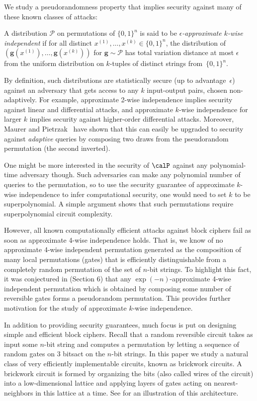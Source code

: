 We study a pseudorandomness property that implies security against many of these known classes of attacks:
\begin{definition}
    A distribution $\mathcal{P}$ on permutations of $\{0,1\}^n$ is said to be \emph{$\epsilon$-approximate $k$-wise independent} if for all distinct $x^{(1)}, \dots, x^{(k)} \in \{0,1\}^n$, the distribution of $(\boldsymbol{g}(x^{(1)}), \dots, \boldsymbol{g}(x^{(k)}))$ for $\boldsymbol{g} \sim \mathcal{P}$ has total variation distance at most $\epsilon$ from the uniform distribution on $k$-tuples of distinct strings from~$\{0,1\}^n$.
\end{definition}
By definition, such distributions are statistically secure (up to advantage~$\epsilon$) against an adversary that gets access to any $k$ input-output pairs, chosen non-adaptively. For example, approximate 2-wise independence implies security against linear and differential attacks, and approximate $k$-wise independence for larger $k$ implies security against higher-order differential attacks. Moreover, Maurer and Pietrzak~\cite{maurer2004composition} have shown that this can easily be upgraded to security against \emph{adaptive} queries by composing two draws from the pseudorandom permutation (the second inverted). 

One might be more interested in the security of $\calP$ against any polynomial-time adversary though. Such adversaries can make any polynomial number of queries to the permutation, so to use the security guarantee of approximate $k$-wise independence to infer computational security, one would need to set $k$ to be superpolynomial. A simple argument shows that such permutations require superpolynomial circuit complexity.

However, all known computationally efficient attacks against block ciphers fail as soon as approximate 4-wise independence holds. That is, we know of no approximate 4-wise independent permutation generated as the composition of many local permutations (gates) that is efficiently distinguishable from a completely random permutation of the set of $n$-bit strings. To highlight this fact, it was conjectured in \cite{hoory2005simple} (Section 6) that any $\exp(-n)$-approximate 4-wise independent permutation which is obtained by composing some number of reversible gates forms a pseudorandom permutation. This provides further motivation for the study of approximate $k$-wise independence. 

In addition to providing security guarantees, much focus is put on designing simple and efficient block ciphers. Recall that a random reversible circuit takes as input some $n$-bit string and computes a permutation by letting a sequence of random gates on 3 bits\footnotemark act on the $n$-bit strings.  In this paper we study a natural class of very efficiently implementable circuits, known as brickwork circuits. A brickwork circuit is formed by organizing the bits (also called wires of the circuit) into a low-dimensional lattice and applying layers of gates acting on nearest-neighbors in this lattice at a time. See  for an illustration of this architecture. 


